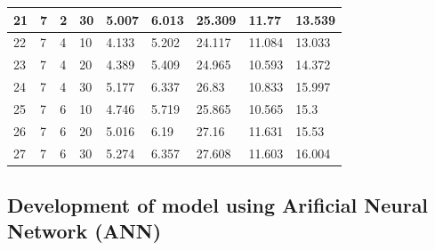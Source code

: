 \documentclass[suppldata]{interact}
\begin{document}
\begin{table}[htbp]
\begin{tabular}{|l|l|l|l|l|l|l|l|l|}
        21 & 7 & 2 & 30 & 5.007 & 6.013 & 25.309 & 11.77 & 13.539 \\ \hline
        22 & 7 & 4 & 10 & 4.133 & 5.202 & 24.117 & 11.084 & 13.033 \\ \hline
        23 & 7 & 4 & 20 & 4.389 & 5.409 & 24.965 & 10.593 & 14.372 \\ \hline
        24 & 7 & 4 & 30 & 5.177 & 6.337 & 26.83 & 10.833 & 15.997 \\ \hline
        25 & 7 & 6 & 10 & 4.746 & 5.719 & 25.865 & 10.565 & 15.3 \\ \hline
        26 & 7 & 6 & 20 & 5.016 & 6.19 & 27.16 & 11.631 & 15.53 \\ \hline
        27 & 7 & 6 & 30 & 5.274 & 6.357 & 27.608 & 11.603 & 16.004 \\ \hline
    \end{tabular}
    \label{tab:inputoutput}
\end{table}
\newpage
 \subsection{Development of model using  Arificial Neural Network (ANN) }
\end{document}
